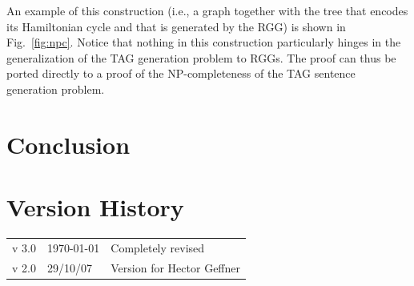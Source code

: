 \documentclass[11pt,a4]{article}
\theoremstyle{plain}
\theoremstyle{definition}
\begin{document}
An example of this construction (i.e., a graph together with the tree
that encodes its Hamiltonian cycle and that is generated by the RGG)
is shown in Fig.~\ref{fig:npc}. Notice that nothing in this
construction particularly hinges in the generalization of the TAG
generation problem to RGGs. The proof can thus be ported directly to a
proof of the NP-completeness of the TAG sentence generation problem.



\section{Conclusion}
\label{sec:conclusion}






\section*{Version History}

\begin{tabular}{lll}
  v 3.0 & \today & Completely revised \\
  v 2.0 & 29/10/07 & Version for Hector Geffner
\end{tabular}





\end{document}
